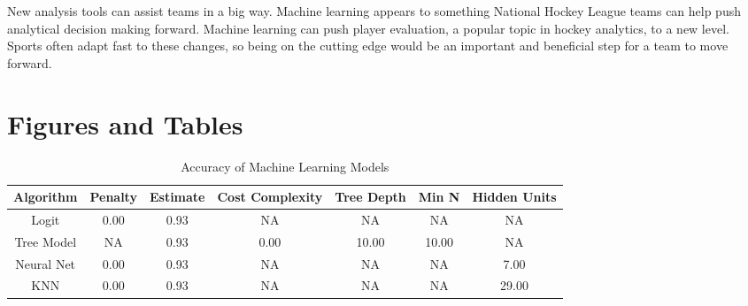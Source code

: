 \documentclass[12pt,english]{article}
\begin{document}
New analysis tools can assist teams in a big way. Machine learning appears to something National Hockey League teams can help push analytical decision making forward. Machine learning can push player evaluation, a popular topic in hockey analytics, to a new level. Sports often adapt fast to these changes, so being on the cutting edge would be an important and beneficial step for a team to move forward. 

\vfill
\pagebreak{}
\begin{spacing}{1.0}


\end{spacing}

\vfill
\pagebreak{}
\clearpage

\section*{Figures and Tables}\label{sec:figTables}


\begin{table}[ht]
\caption{Accuracy of Machine Learning Models}
\label{tab:estimates} 
\centering
    \begin{tabular}{|c|c|c|c|c|c|c|}
         \hline Algorithm & Penalty & Estimate & Cost Complexity & Tree Depth & Min N & Hidden Units \\
         \hline Logit & 0.00 & 0.93 & NA & NA & NA & NA \\
         \hline Tree Model & NA & 0.93 & 0.00 & 10.00 & 10.00 & NA \\
         \hline Neural Net & 0.00 & 0.93 & NA & NA & NA & 7.00 \\
         \hline KNN & 0.00 & 0.93 & NA & NA & NA & 29.00 \\
         \hline
    \end{tabular}
\end{table}
\end{document}
